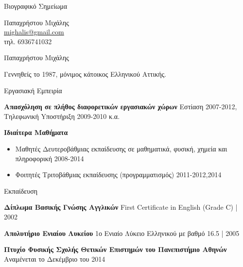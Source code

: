 \documentclass[a4paper,12pt,final]{memoir}
\newcommand{\Sep}{\vspace{1.3em}}
\newcommand{\SmallSep}{\vspace{0.4em}}
\newenvironment{AboutMe}
	{\ignorespaces\textbf{\color{RoyalBlue} \textbullet{}}}
	{\Sep\ignorespacesafterend}
\newcommand{\CVSection}[1]
	{\Large{#1}\par
	\SmallSep\normalsize\normalfont}
\newcommand{\CVItem}[2]
	{\textbf{\color{RoyalBlue} #1} #2}
\newcommand{\location}[1]{ %
\small{\color{headings}#1}}
\newenvironment{tightitemize} %
{\vspace{-\topsep}\begin{itemize}\itemsep1pt \parskip0pt \parsep0pt}
{\end{itemize}\vspace{-\topsep}}
\begin{document}
\begin{flushright}
Βιογραφικό Σημείωμα
\vspace{0.75cm}

\small
	Παπαχρήστου Μιχάλης \\
	\url{mighalis@gmail.com}  \\
	τηλ. 6936741032
\end{flushright}\normalsize
\framebreak


\Huge {\color{RoyalBlue} Παπαχρήστου Μιχάλης} \\

\normalsize\normalfont

\begin{AboutMe}
Γεννηθείς το 1987, μόνιμος κάτοικος Ελληνικού Αττικής.
\end{AboutMe}

\CVSection{Εργασιακή Εμπειρία}

\SmallSep

\CVItem{Aπασχόληση σε πλήθος διαφορετικών εργασιακών χώρων}{\newline}
\location{Eστίαση 2007-2012, Tηλεφωνική Yποστήριξη 2009-2010 κ.α.}


\CVItem{Ιδιαίτερα Μαθήματα}{}
\begin{tightitemize}
	\item Μαθητές Δευτεροβάθμιας εκπαίδευσης σε μαθηματικά, φυσική, χημεία και πληροφορική \location{2008-2014}
	\item Φοιτητές Τριτοβάθμιας εκπαίδευσης (προγραμματισμός)
	\location{2011-2012,2014}
\end{tightitemize}
\SmallSep

\CVSection{Εκπαίδευση}
\CVItem{Δίπλωμα Βασικής Γνώσης Αγγλικών}{\newline}
\location{First Certificate in English (Grade C) | 2002}
\SmallSep

\CVItem{Απολυτήριο Ενιαίου Λυκείου}{\newline}
\location{1ο Ενιαίο Λύκειο Ελληνικού με βαθμό 16.5 | 2005}
\SmallSep

\CVItem{Πτυχίο Φυσικής Σχολής Θετικών Επιστημών του Πανεπιστήμιο Αθηνών}{\newline}
\location{Αναμένεται το Δεκέμβριο του 2014}
\SmallSep
\end{document}
